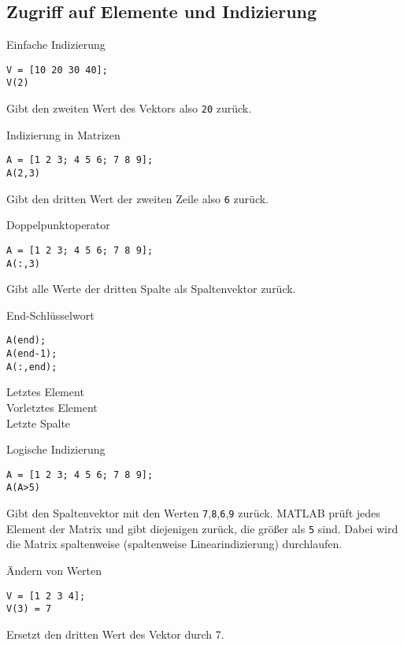         \subsection{Zugriff auf Elemente und Indizierung}
        \begin{CodeErklaerungBox}{Einfache Indizierung}
                \begin{lstlisting}
V = [10 20 30 40];
V(2)
                \end{lstlisting}
                \tcblower
                Gibt den zweiten Wert des Vektors also \texttt{20} zurück.
                \end{CodeErklaerungBox}
                \begin{CodeErklaerungBox}{Indizierung in Matrizen}
                \begin{lstlisting}
A = [1 2 3; 4 5 6; 7 8 9];
A(2,3)
                \end{lstlisting}
                \tcblower
                Gibt den dritten Wert der zweiten Zeile also \texttt{6} zurück.
            \end{CodeErklaerungBox}
            \begin{CodeErklaerungBox}{Doppelpunktoperator}
                \begin{lstlisting}
A = [1 2 3; 4 5 6; 7 8 9];
A(:,3)
                \end{lstlisting}
                \tcblower
                Gibt alle Werte der dritten Spalte als Spaltenvektor zurück.
            \end{CodeErklaerungBox}
            \begin{CodeErklaerungBox}{End-Schlüsselwort}
                \begin{lstlisting}
A(end);
A(end-1);
A(:,end);
                \end{lstlisting}
                \tcblower
                Letztes Element\\
                Vorletztes Element\\
                Letzte Spalte
            \end{CodeErklaerungBox}
            \begin{CodeErklaerungBox}{Logische Indizierung}
                \begin{lstlisting}
A = [1 2 3; 4 5 6; 7 8 9];
A(A>5)
                \end{lstlisting}
                \tcblower
                Gibt den Spaltenvektor mit den Werten \texttt{7},\texttt{8},\texttt{6},\texttt{9} zurück. MATLAB prüft jedes Element der Matrix und gibt diejenigen zurück, die größer als \texttt{5} sind. Dabei wird die Matrix spaltenweise (spaltenweise Linearindizierung) durchlaufen.
\end{CodeErklaerungBox}
            \begin{CodeErklaerungBox}{Ändern von Werten}
                \begin{lstlisting}
V = [1 2 3 4];
V(3) = 7
                \end{lstlisting}
                \tcblower
                Ersetzt den dritten Wert des Vektor durch 7.
            \end{CodeErklaerungBox}
